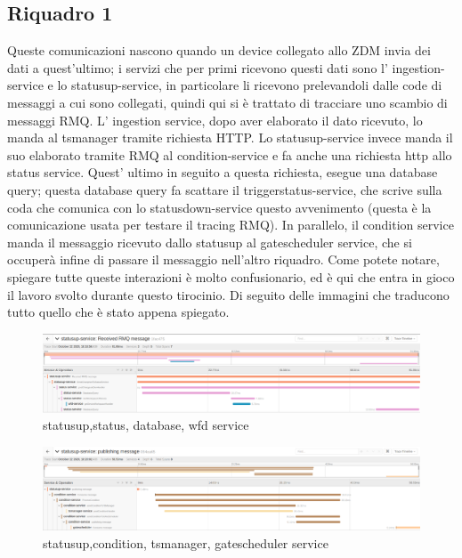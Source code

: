 \documentclass[a4paper,12pt,titlepage,italian,openany]{report}
\begin{document}
\subsection{Riquadro 1}
Queste comunicazioni nascono quando un device collegato allo ZDM\cite{zdm:1} invia dei dati a quest'ultimo; i servizi che per primi ricevono questi dati
 sono l' ingestion-service e lo statusup-service, in particolare li ricevono prelevandoli dalle code di messaggi a cui sono collegati, quindi qui si è 
 trattato di tracciare uno scambio di messaggi RMQ\cite{rabbit:1}. L' ingestion service, dopo aver elaborato il dato ricevuto, lo manda al tsmanager tramite
richiesta HTTP. Lo statusup-service invece manda il suo elaborato tramite RMQ\cite{rabbit:1} al condition-service e fa anche una richiesta http allo status service. 
Quest' ultimo in seguito a questa richiesta, esegue una database query; questa database query fa scattare il triggerstatus-service, che scrive sulla coda che
 comunica con lo statusdown-service questo avvenimento (questa è la comunicazione usata per testare il tracing RMQ\cite{rabbit:1}). In parallelo, il condition service manda il messaggio ricevuto dallo statusup al gatescheduler service, che si occuperà infine di passare il messaggio nell'altro riquadro. Come potete notare, spiegare tutte queste interazioni è molto confusionario, ed è qui che entra in gioco il lavoro svolto durante questo tirocinio. Di seguito delle immagini che traducono tutto quello che è stato appena spiegato.
\begin{figure}[H]
    \includegraphics[scale=0.21]{49.png}
    \centering
    \caption{statusup,status, database, wfd service}
    
\end{figure}
\begin{figure}[H]
    \includegraphics[scale=0.21]{51.png}
    \centering
    \caption{statusup,condition, tsmanager, gatescheduler service}
    
\end{figure}
\end{document}
